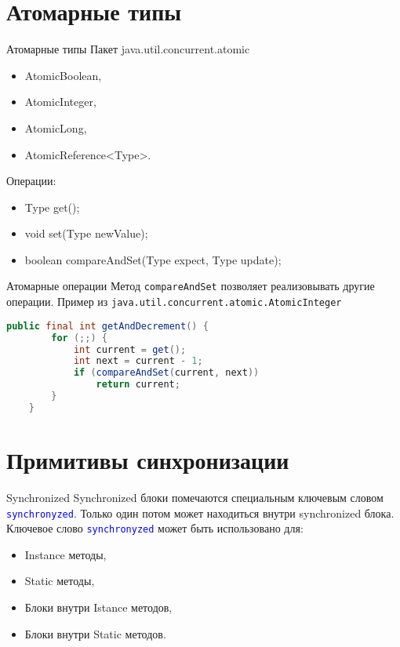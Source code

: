 \section{Атомарные типы}

\begin{frame}{Атомарные типы}
Пакет java.util.concurrent.atomic
\vfill
\begin{itemize}
    \item AtomicBoolean,
    \item AtomicInteger,
    \item AtomicLong,
    \item AtomicReference<Type>.
\end{itemize}
\vfill
Операции:
\begin{itemize}
    \item Type get();
    \item void set(Type newValue);
    \item boolean compareAndSet(Type expect, Type update);
\end{itemize}
\end{frame}

\begin{frame}[fragile]{Атомарные операции}
Метод \texttt{compareAndSet} позволяет реализовывать другие операции.
\vfill
Пример из \texttt{java.util.concurrent.atomic.AtomicInteger}
\begin{lstlisting}[language=Java]
public final int getAndDecrement() {
        for (;;) {
            int current = get();
            int next = current - 1;
            if (compareAndSet(current, next))
                return current;
        }
    }
\end{lstlisting}
\end{frame}

\section{Примитивы синхронизации}

\begin{frame}{Synchronized}
Synchronized блоки помечаются специальным ключевым словом \textcolor{blue}{\texttt{synchronyzed}}.
\vfill
Только один потом может находиться внутри synchronized блока.
\vfill
Ключевое слово \textcolor{blue}{\texttt{synchronyzed}} может быть использовано для:
\begin{itemize}
    \item Instance методы,
    \item Static методы,
    \item Блоки внутри Istance методов,
    \item Блоки внутри Static методов.
\end{itemize}
\end{frame}

